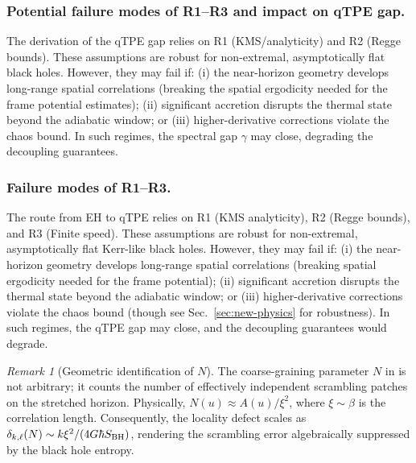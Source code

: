 \documentclass[11pt,a4paper]{article}
\theoremstyle{plain}
\theoremstyle{definition}
\theoremstyle{remark}
\newtheorem{remark}[theorem]{Remark}
\begin{document}
\subsubsection{Potential failure modes of R1--R3 and impact on qTPE gap.}
The derivation of the qTPE gap relies on R1 (KMS/analyticity) and R2 (Regge bounds). These assumptions are robust for non-extremal, asymptotically flat black holes. However, they may fail if: (i) the near-horizon geometry develops long-range spatial correlations (breaking the spatial ergodicity needed for the frame potential estimates); (ii) significant accretion disrupts the thermal state beyond the adiabatic window; or (iii) higher-derivative corrections violate the chaos bound. In such regimes, the spectral gap $\gamma$ may close, degrading the decoupling guarantees.

\subsubsection{Failure modes of R1--R3.}
The route from EH to qTPE relies on R1 (KMS analyticity), R2 (Regge bounds), and R3 (Finite speed).
These assumptions are robust for non-extremal, asymptotically flat Kerr-like black holes.
However, they may fail if: (i) the near-horizon geometry develops long-range spatial correlations (breaking spatial ergodicity needed for the frame potential); (ii) significant accretion disrupts the thermal state beyond the adiabatic window; or (iii) higher-derivative corrections violate the chaos bound (though see Sec.~\ref{sec:new-physics} for robustness).
In such regimes, the qTPE gap may close, and the decoupling guarantees would degrade.

\begin{remark}[Geometric identification of $N$]\label{rem:geometric-N}
The coarse-graining parameter $N$ in  is not arbitrary; it counts the number of effectively independent scrambling patches on the stretched horizon. Physically, $N(u) \approx A(u) / \xi^2$, where $\xi \sim \beta$ is the correlation length. Consequently, the locality defect scales as $\delta_{k,\ell}(N) \sim k \xi^2 / (4 G \hbar S_{\rm BH})$, rendering the scrambling error algebraically suppressed by the black hole entropy.
\end{remark}
\end{document}
